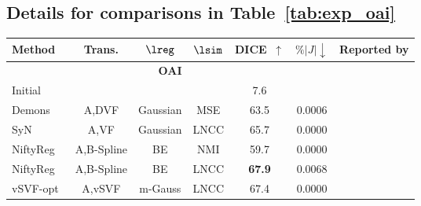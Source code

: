 \subsection{Details for comparisons in Table~\ref{tab:exp_oai}}
\label{sec:appendix_sota_comp}
\begin{table*}[b]
	\centering
	\begin{small}
		\begin{tabular}{lcccccc}
			\toprule
			\bf Method                                            & \bf Trans.              & $\lreg$                               & $\lsim$     & \bf DICE\, $\uparrow$      & $\%|J|\downarrow$ & Reported by                      \\
			\midrule
			\multicolumn{6}{c}{\bf OAI}                                                                                                                                                                                               \\
			Initial                                               &                         &                                       &             & 7.6\resTS                                                                         \\
			\midrule
			Demons~\cite{vercauteren2009diffeomorphic}            & A,DVF                   & Gaussian                              & MSE         & 63.5\resTS                 & 0.0006            & \cite{shen2019networks}          \\
			SyN~\cite{avants2008symmetric}                        & A,VF                    & Gaussian                              & LNCC        & 65.7\resTS                 & 0.0000            & ~\cite{shen2019networks}         \\
			NiftyReg~\cite{modat2010fast}                         & A,B-Spline              & BE                                    & NMI         & 59.7\resTS                 & 0.0000            & ~\cite{shen2019networks}         \\
			NiftyReg~\cite{modat2010fast}                         & A,B-Spline              & BE                                    & LNCC        & {\bf 67.9}\resTS           & 0.0068
			                                                      & \cite{shen2019networks}                                                                                                                                           \\
			vSVF-opt~\cite{shen2019networks}                      & A,vSVF                  & m-Gauss                               & LNCC        & 67.4\resTS                 & 0.0000            & ~\cite{shen2019networks}         \\ \hline

\end{tabular}
\end{small}
\end{table*}
